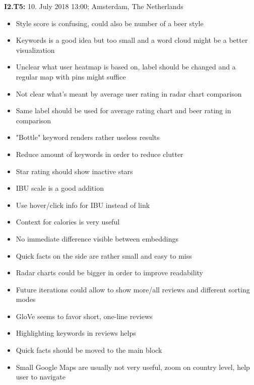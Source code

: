 \hfill

\begin{flushleft}
    \textbf{I2.T5:} 10. July 2018 13:00; Amsterdam, The Netherlands
    \begin{itemize}
        \item Style score is confusing, could also be number of a beer style
        \item Keywords is a good idea but too small and a word cloud might be a better visualization
        \item Unclear what user heatmap is based on, label should be changed and a regular map with pins might suffice
        \item Not clear what's meant by average user rating in radar chart comparison
        \item Same label should be used for average rating chart and beer rating in comparison
        \item "Bottle" keyword renders rather useless results
        \item Reduce amount of keywords in order to reduce clutter
        \item Star rating should show inactive stars
        \item IBU scale is a good addition
        \item Use hover/click info for IBU instead of link
        \item Context for calories is very useful
        \item No immediate difference visible between embeddings
        \item Quick facts on the side are rather small and easy to miss
        \item Radar charts could be bigger in order to improve readability
        \item Future iterations could allow to show more/all reviews and different sorting modes
        \item GloVe seems to favor short, one-line reviews
        \item Highlighting keywords in reviews helps
        \item Quick facts should be moved to the main block
        \item Small Google Maps are usually not very useful, zoom on country level, help user to navigate
    \end{itemize}
\end{flushleft}

\clearpage

